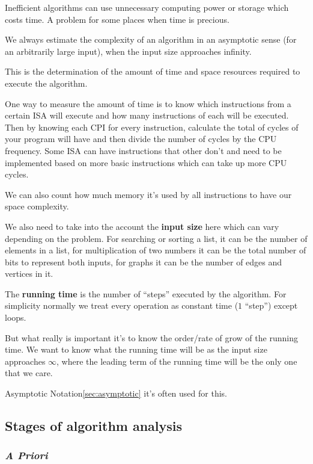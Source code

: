\documentclass[a4paper,12pt]{article}
\theoremstyle{mytheoremstyle}
\theoremstyle{mytheoremstyle}
\theoremstyle{myproblemstyle}
\begin{document}
    Inefficient algorithms can use unnecessary computing power or storage which
    costs time. A problem for some places when time is precious.

    We always estimate the complexity of an algorithm in an asymptotic sense
    (for an arbitrarily large input), when the input size approaches infinity.

    This is the determination of the amount of time and space resources
    required to execute the algorithm.

    One way to measure the amount of time is to know which instructions from a
    certain ISA will execute and how many instructions of each will be
    executed. Then by knowing each CPI for every instruction, calculate the
    total of cycles of your program will have and then divide the number of
    cycles by the CPU frequency. Some ISA can have instructions that other
    don't and need to be implemented based on more basic instructions which can
    take up more CPU cycles.

    We can also count how much memory it's used by
    all instructions to have our space complexity.

    We also need to take into the account the \textbf{input size} here which
    can vary depending on the problem. For searching or sorting a list, it can
    be the number of elements in a list, for multiplication of two numbers it
    can be the total number of bits to represent both inputs, for
    graphs it can be the number of edges and vertices in it.

    The \textbf{running time} is the number of ``steps'' executed by the
    algorithm. For simplicity normally we treat every operation as constant
    time ($ 1 $ ``step'') except loops.

    But what really is important it's to know the order/rate of grow of the
    running time. We want to know what the running time will be as the input
    size approaches $ \infty $, where the leading term of the running time will
    be the only one that we care.

    Asymptotic Notation\ref{sec:asymptotic} it's often used for this.

    \subsection{Stages of algorithm analysis}

    \subsubsection{\textit{A Priori}}
\end{document}
